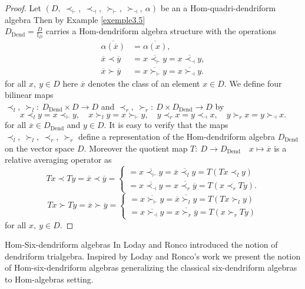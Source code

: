 \documentclass[11pt,twoside,reqno]{amsart}
\makeatletter
\renewcommand{\section}{\@startsection{section}{1}
  \z@{.7\linespacing\@plus\linespacing}{.5\linespacing}
  {\normalfont\upshape\bfseries\centering}}
\theoremstyle{plain}
\theoremstyle{definition}
\makeatother
\begin{document}
\begin{proof}
  Let $(D ,\ \prec_\vdash,\  \prec_\dashv,\   \succ_\vdash,\   \succ_\dashv,\  \alpha)$ be an a Hom-quadri-dendriform algebra  Then by Example \ref{exemple3.5}  \\$D_{\text{Dend}} = \frac{D}{\mathbb{I}_D}$  
carries a Hom-dendriform algebra structure with the operations
\begin{align*}
\overline{\alpha(\overline{x})}&=\overline{\alpha(x)},\\
\overline{x} \prec \overline{y} &=\overline{x \prec_{\vdash} y} = \overline{x \prec_{\dashv} y}  ,\\
\overline{x} \succ \overline{y} &= \overline{x \succ_{\vdash} y}= \overline{x \succ_{\dashv} y}.
\end{align*}
 for all $x,\ y \in D$  here $\overline{x}$ denotes the class of an element $x \in D$. We define four bilinear
 maps\\ $\prec_l ,\  \succ_l :\ D_{\text{Dend}} \times D \to D$
and $\prec_r ,\ \succ_r :\ D \times D_{\text{Dend}} \to D$ by\\ \[
x \prec_l y = x \prec_{\vdash} y  ,\quad
x \succ_l y = x \succ_{\vdash} y  ,\quad
y \prec_r x = y \prec_{\dashv} x  ,\quad
y \succ_r x = y \succ_{\dashv} x.
\]
for all $\overline{x} \in D_{\text{Dend}}$ and $y \in D$. It is easy to verify that the maps $\prec_l,\  \succ_l ,\ \prec_r,\  \succ_r$ define a representation of the Hom-dendriform algebra $D_{\text{Dend}}$ on the vector space $D$. Moreover  the quotient map $T :\ D \to D_{\text{Dend}}  \quad x \mapsto \overline{x}$ is a relative averaging operator as\\
\[
T x \prec T y =\overline{x} \prec \overline{y}=
 \left\{
\begin{array}{l}= \overline{x \prec_{\vdash} y}
= \overline{\overline{x} \prec_l y} = T(T x \prec_l y)  \\
= \overline{x \prec_{\dashv} y} 
= \overline{x \prec_r \overline{y}} = T(x \prec_r T y). 
\end{array}
\right.
\]
\[
T x \succ T y =\overline{x} \succ \overline{y}=
\left\{
\begin{array}{l}= \overline{x \succ_{\vdash} y}
= \overline{\overline{x} \succ_l y} = T(T x \succ_l y) \\
= \overline{x \succ_{\dashv} y}
= \overline{x \succ_r \overline{y}} = T(x \succ_r T y) 
\end{array}
\right.
\]
for all $x,\ y \in D.$
\end{proof}

\section{Hom-Six-dendriform algebras}
In \cite{LR}  Loday and Ronco introduced the notion of dendriform trialgebra. Inspired by Loday and Ronco’s work  we present the notion  of Hom-six-dendriform algebras 
generalizing the classical six-dendriform algebras to Hom-algebras setting. 
\end{document}
